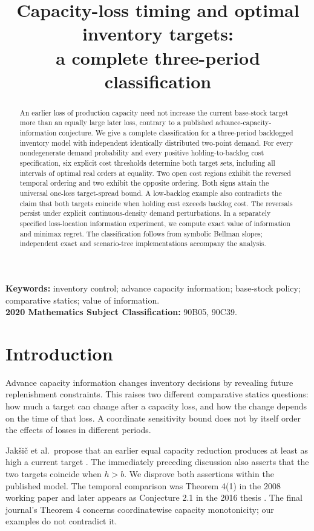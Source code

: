 \documentclass[11pt]{article}
\title{Capacity-loss timing and optimal inventory targets:\\a complete three-period classification}
\author{}
\date{}
\makeatletter
\theoremstyle{remark}\newtheorem{remark}[theorem]{Remark}
\renewcommand{\maketitle}{\begin{center}{\Large\bfseries\@title\par}\end{center}\vspace{0.5em}}
\makeatother
\begin{document}
\maketitle
\begin{abstract}
An earlier loss of production capacity need not increase the current
base-stock target more than an equally large later loss, contrary to a
published advance-capacity-information conjecture. We give a complete
classification for a three-period backlogged inventory model with
independent identically distributed two-point demand. For every
nondegenerate demand probability and every positive holding-to-backlog
cost specification, six explicit cost thresholds determine both target
sets, including all intervals of optimal real orders at equality.
Two open cost regions exhibit the reversed temporal ordering and two
exhibit the opposite ordering. Both signs attain the universal
one-loss target-spread bound. A low-backlog example also contradicts the
claim that both targets coincide when holding cost exceeds backlog cost.
The reversals persist under explicit continuous-density demand
perturbations. In a separately specified loss-location information
experiment, we compute exact value of information and minimax regret.
The classification follows from symbolic Bellman slopes; independent
exact and scenario-tree implementations accompany the analysis.
\end{abstract}
\noindent\textbf{Keywords:} inventory control; advance capacity information;
base-stock policy; comparative statics; value of information.\\
\textbf{2020 Mathematics Subject Classification:} 90B05, 90C39.

\section{Introduction}
Advance capacity information changes inventory decisions by revealing
future replenishment constraints. This raises two different comparative
statics questions: how much a target can change after a capacity loss,
and how the change depends on the time of that loss. A coordinate
sensitivity bound does not by itself order the effects of losses in
different periods.

Jak\v{s}i\v{c} et al.\ propose that an earlier equal capacity reduction
produces at least as high a current target
\cite[Conjecture 1, p.~360]{Journal}. The immediately preceding discussion
also asserts that the two targets coincide when $h>b$. We disprove both
assertions within the published model. The temporal comparison was
Theorem 4(1) in the 2008 working paper \cite{WP} and later appears as
Conjecture 2.1 in the 2016 thesis \cite{Thesis}. The final journal's
Theorem 4 concerns coordinatewise capacity monotonicity; our examples
do not contradict it.
\end{document}
